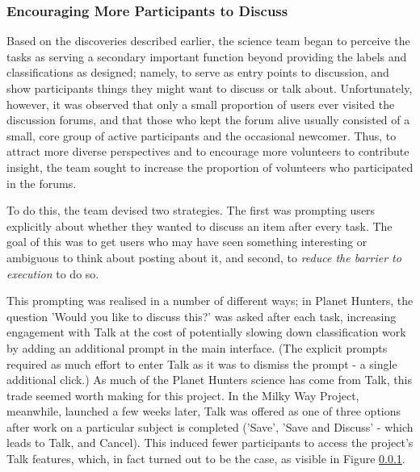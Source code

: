 \documentclass{sigchi}
\begin{document}
\subsubsection{Encouraging More Participants to Discuss}

Based on the discoveries described earlier, the science team began to perceive the tasks as serving a secondary important function beyond providing the labels and classifications as designed; namely, to serve as entry points to discussion, and show participants things they might want to discuss or talk about.   %
Unfortunately, however, it was observed that only a small proportion of users ever visited the discussion forums, and that those who kept the forum alive usually consisted of a small, core group of active participants and the occasional newcomer. Thus, to attract more diverse perspectives and to encourage more volunteers to contribute insight, the team sought to increase the proportion of volunteers who participated in the forums.


To do this, the team devised two strategies. The first was prompting users explicitly about whether they wanted to discuss an item after every task.  The goal of this was to get users who may have seen something interesting or ambiguous to think about posting about it, and second, to \emph{reduce the barrier to execution} \cite{norman2002design} to do so.  


This prompting was realised in a number of different ways; in Planet Hunters, the question 'Would you like to discuss this?' was asked after each task, increasing engagement with Talk at the cost of potentially slowing down classification work by adding an additional prompt in the main interface.  (The explicit prompts required as much effort to enter Talk as it was to dismiss the prompt - a single additional click.) As much of the Planet Hunters science has come from Talk, this trade seemed worth making for this project.  In the Milky Way Project,  meanwhile, launched a few weeks later, Talk was offered as one of three options after work on a particular subject is completed ('Save', 'Save and Discuss' - which leads to Talk, and Cancel).  This induced fewer participants to access the project's Talk features, which, in fact turned out to be the case, as visible in Figure \ref{}.  %
\end{document}
